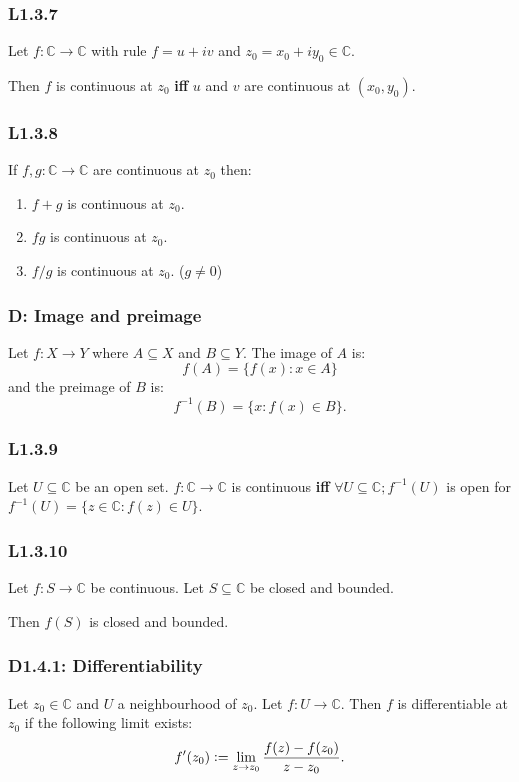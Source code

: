 \documentclass{article}
\newcommand{\deq}{\vcentcolon=}
\begin{document}
\begin{multicols*}{3}
\subsubsection*{L1.3.7}
Let $f:\mathbb{C}\rightarrow\mathbb{C}$ with rule $f=u+iv$
and $z_0=x_0+iy_0\in\mathbb{C}$.

Then $f$ is continuous at $z_0$ \textbf{if{}f}
$u$ and $v$ are continuous at $(x_0,y_0)$.

\subsubsection*{L1.3.8}
If $f,g:\mathbb{C}\rightarrow\mathbb{C}$
are continuous at $z_0$ then:
\begin{enumerate}
    \item $f+g$ is continuous at $z_0$.
    
    \item $fg$ is continuous at $z_0$.
    
    \item $f/g$ is continuous at $z_0$.
    ($g\neq0$)
\end{enumerate}

\subsubsection*{D: Image and preimage}
Let $f:X\rightarrow Y$ where $A\subseteq X$ and $B\subseteq Y$.
The image of $A$ is:
$$f(A)=\{f(x):x\in A\}$$
and the preimage of $B$ is:
$$f^{-1}(B)=\{x:f(x)\in B\}.$$

\subsubsection*{L1.3.9}
Let $U\subseteq\mathbb{C}$ be an open set.
$f:\mathbb{C}\rightarrow\mathbb{C}$ is continuous \textbf{if{}f}
$\forall U\subseteq\mathbb{C}; f^{-1}(U)$ is open
for $f^{-1}(U)=\{z\in\mathbb{C}:f(z)\in U\}$.

\subsubsection*{L1.3.10}
Let $f:S\rightarrow\mathbb{C}$ be continuous.
Let $S\subseteq\mathbb{C}$ be closed and bounded.

Then $f(S)$ is closed and bounded.

\subsubsection*{D1.4.1: Differentiability}
Let $z_0\in\mathbb{C}$ and $U$ a neighbourhood of $z_0$.
Let $f:U\rightarrow\mathbb{C}$. Then $f$ is differentiable at $z_0$ if
the following limit exists:
$$f'(z_0)\deq\lim_{z\rightarrow z_0}\frac{f(z)-f(z_0)}{z-z_0}.$$


\end{multicols*}
\end{document}

